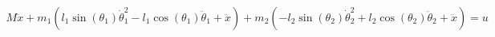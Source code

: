 \documentclass[preview]{standalone}
\begin{document}
\begin{align*}
M \ddot{x} + m_{1} \left(l_{1} \operatorname{sin}\left(\theta_{1}\right) \dot{\theta}_{1}^{2} - l_{1} \operatorname{cos}\left(\theta_{1}\right) \ddot{\theta}_{1} + \ddot{x}\right) + m_{2} \left(- l_{2} \operatorname{sin}\left(\theta_{2}\right) \dot{\theta}_{2}^{2} + l_{2} \operatorname{cos}\left(\theta_{2}\right) \ddot{\theta}_{2} + \ddot{x}\right) = u
\end{align*}
\end{document}
